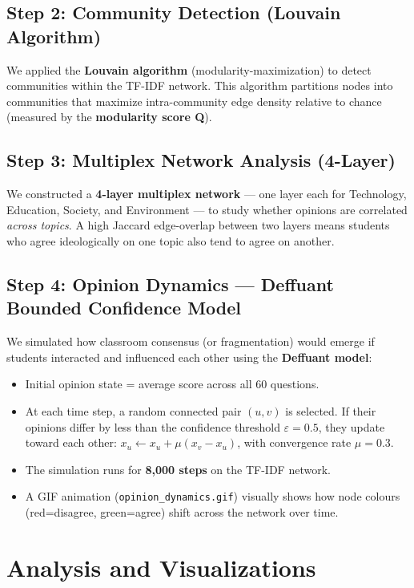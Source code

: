 \documentclass[11pt]{article}
\begin{document}
\subsection{Step 2: Community Detection (Louvain Algorithm)}
We applied the \textbf{Louvain algorithm} (modularity-maximization) to detect communities within the TF-IDF network. This algorithm partitions nodes into communities that maximize intra-community edge density relative to chance (measured by the \textbf{modularity score Q}).

\subsection{Step 3: Multiplex Network Analysis (4-Layer)}
We constructed a \textbf{4-layer multiplex network} — one layer each for Technology, Education, Society, and Environment — to study whether opinions are correlated \textit{across topics}. A high Jaccard edge-overlap between two layers means students who agree ideologically on one topic also tend to agree on another.

\subsection{Step 4: Opinion Dynamics — Deffuant Bounded Confidence Model}
We simulated how classroom consensus (or fragmentation) would emerge if students interacted and influenced each other using the \textbf{Deffuant model}:
\begin{itemize}
    \item Initial opinion state = average score across all 60 questions.
    \item At each time step, a random connected pair $(u, v)$ is selected. If their opinions differ by less than the confidence threshold $\varepsilon = 0.5$, they update toward each other: $x_u \leftarrow x_u + \mu(x_v - x_u)$, with convergence rate $\mu = 0.3$.
    \item The simulation runs for \textbf{8,000 steps} on the TF-IDF network.
    \item A GIF animation (\texttt{opinion\_dynamics.gif}) visually shows how node colours (red=disagree, green=agree) shift across the network over time.
\end{itemize}

\section{Analysis and Visualizations}
\end{document}

